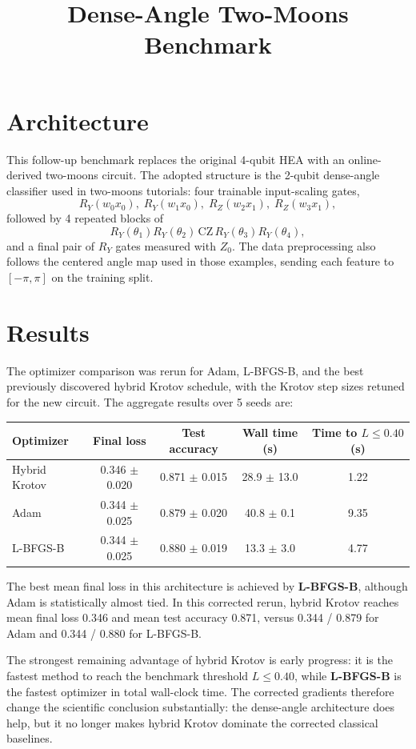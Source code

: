 \documentclass[11pt]{article}
\title{Dense-Angle Two-Moons Benchmark}
\date{}
\begin{document}
\maketitle

\section*{Architecture}
This follow-up benchmark replaces the original 4-qubit HEA with an online-derived two-moons circuit. The adopted structure is the 2-qubit dense-angle classifier used in two-moons tutorials: four trainable input-scaling gates,
\[
R_Y(w_0 x_0),\; R_Y(w_1 x_0),\; R_Z(w_2 x_1),\; R_Z(w_3 x_1),
\]
followed by 4 repeated blocks of
\[
R_Y(\theta_1) R_Y(\theta_2)\,\mathrm{CZ}\,R_Y(\theta_3) R_Y(\theta_4),
\]
and a final pair of $R_Y$ gates measured with $Z_0$. The data preprocessing also follows the centered angle map used in those examples, sending each feature to $[-\pi, \pi]$ on the training split.

\section*{Results}
The optimizer comparison was rerun for Adam, L-BFGS-B, and the best previously discovered hybrid Krotov schedule, with the Krotov step sizes retuned for the new circuit. The aggregate results over 5 seeds are:

\begin{center}
\begin{tabular}{lcccc}
\toprule
Optimizer & Final loss & Test accuracy & Wall time (s) & Time to $L \le 0.40$ (s) \\
\midrule
Hybrid Krotov & 0.346 $\pm$ 0.020 & 0.871 $\pm$ 0.015 & 28.9 $\pm$ 13.0 & 1.22 \\
Adam & 0.344 $\pm$ 0.025 & 0.879 $\pm$ 0.020 & 40.8 $\pm$ 0.1 & 9.35 \\
L-BFGS-B & 0.344 $\pm$ 0.025 & 0.880 $\pm$ 0.019 & 13.3 $\pm$ 3.0 & 4.77 \\
\bottomrule
\end{tabular}
\end{center}

The best mean final loss in this architecture is achieved by \textbf{L-BFGS-B}, although Adam is statistically almost tied. In this corrected rerun, hybrid Krotov reaches mean final loss 0.346 and mean test accuracy 0.871, versus 0.344 / 0.879 for Adam and 0.344 / 0.880 for L-BFGS-B.

The strongest remaining advantage of hybrid Krotov is early progress: it is the fastest method to reach the benchmark threshold $L \le 0.40$, while \textbf{L-BFGS-B} is the fastest optimizer in total wall-clock time. The corrected gradients therefore change the scientific conclusion substantially: the dense-angle architecture does help, but it no longer makes hybrid Krotov dominate the corrected classical baselines.
\end{document}
